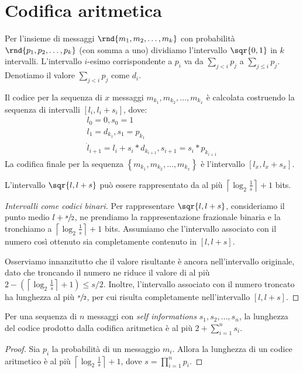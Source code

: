 \documentclass[\main/main.tex]{subfiles}
\begin{document}
\section{Codifica aritmetica}
\begin{multicols}{2}
\begin{definition}
    Per l'insieme di messaggi \(\rnd{m_1, m_2, \ldots, m_k}\) con probabilità \(\rnd{p_1, p_2, \ldots, p_k}\) (con somma a uno) dividiamo l'intervallo \(\sqr{0,1}\) in \(k\) intervalli. L'intervallo \(i\)-esimo corrispondente a \(p_i\) va da \(\sum_{j<i} p_{j}\) a \(\sum_{j\leq i} p_{j}\). Denotiamo il valore \(\sum_{j<i} p_{j}\) come \(d_i\).
    
    Il codice per la sequenza di \(x\) messaggi \(m_{k_1}, m_{k_2}, \ldots, m_{k_x}\) è calcolata costruendo la sequenza di intervalli \(\left[l_{i}, l_{i}+s_{i}\right]\), dove:
    \[
        \begin{array}{l}{l_{0}=0, s_{0}=1} \\ {l_{1}=d_{k_{1}}, s_{1}=p_{k_{1}}} \\ {\dot{l}_{i+1}=l_{i}+s_{i} * d_{k_{i+1}}, s_{i+1}=s_{i} * p_{k_{i+1}}}\end{array}
    \]
    La codifica finale per la sequenza \(\left\{m_{k_{1}}, m_{k_{2}}, \ldots, m_{k_{x}}\right\}\) è l'intervallo \(\left[l_{x}, l_{x}+s_{x}\right]\).
\end{definition}
\begin{theorem}
    L'intervallo \(\sqr{l, l+s}\) può essere rappresentato da al più \(\left\lceil\log _{2} \frac{1}{s}\right\rceil+ 1\) bits.
\end{theorem}
\begin{proof}[Intervalli come codici binari]
    Per rappresentare \(\sqr{l, l+s}\), consideriamo il punto medio \(l+\sfrac{s}{2}\), ne prendiamo la rappresentazione frazionale binaria e la tronchiamo a \(\left\lceil\log _{2} \frac{1}{s}\right\rceil+ 1\) bits. Assumiamo che l'intervallo associato con il numero così ottenuto sia completamente contenuto in \([l, l+s]\).
    
    Osserviamo innanzitutto che il valore risultante è ancora nell'intervallo originale, dato che troncando il numero ne riduce il valore di al più \(2-\left(\left\lceil\log _{2} \frac{1}{s}\right\rceil+ 1\right) \leq s / 2\). Inoltre, l'intervallo associato con il numero troncato ha lunghezza al più \(\sfrac{s}{2}\), per cui risulta completamente nell'intervallo \([l, l+s]\).
\end{proof}
\begin{theorem}
    Per una sequenza di \(n\) messaggi con \textit{self informations} \(s_1, s_2, \ldots, s_n\), la lunghezza del codice prodotto dalla codifica aritmetica è al più \(2+\sum_{i=1}^{n} s_{i}\).
\end{theorem}
\begin{proof}
    Sia \(p_i\) la probabilità di un messaggio \(m_i\). Allora la lunghezza di un codice aritmetico è al più \(\left\lceil\log _{2} \frac{1}{s}\right\rceil+ 1\), dove \(s=\prod_{i=1}^{n} p_{i}\).
    

\end{proof}
\end{multicols}
\end{document}
